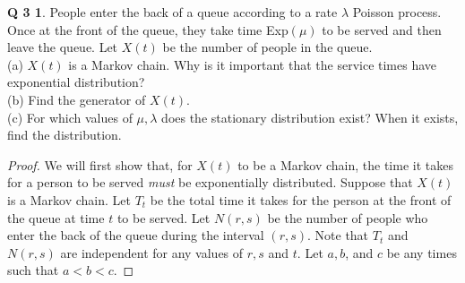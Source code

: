 \documentclass[12pt]{article}
\theoremstyle{definition}
\newtheorem*{prob3}{Q 3}
\begin{document}
\begin{prob3}
People enter the back of a queue according to a rate $\lambda$ Poisson process.  Once at the front of the queue, they take time Exp$(\mu)$ to be served and then leave the queue.  Let $X(t)$ be the number of people in the queue.\\
(a) $X(t)$ is a Markov chain.  Why is it important that the service times have exponential distribution?\\
(b) Find the generator of $X(t)$.\\
(c) For which values of $\mu, \lambda$ does the stationary distribution exist?  When it exists, find the distribution.
\end{prob3}

\begin{proof}
We will first show that, for $X(t)$ to be a Markov chain, the time it takes for a person to be served \emph{must} be exponentially distributed.  Suppose that $X(t)$ is a Markov chain.  Let $T_t$ be the total time it takes for the person at the front of the queue at time $t$ to be served.  Let $N(r,s)$ be the number of people who enter the back of the queue during the interval $(r,s)$.  Note that $T_t$ and $N(r,s)$ are independent for any values of $r,s$ and $t$.  Let $a,b$, and $c$ be any times such that $a < b < c$.


\end{proof}
\end{document}
